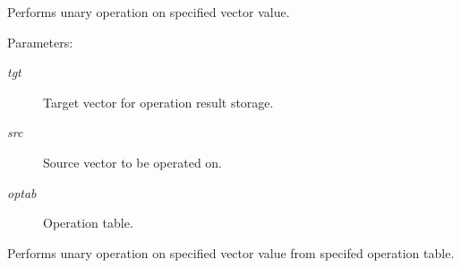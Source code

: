 Performs unary operation on specified vector value.

\begin{Desc}
\item[Parameters: ]\par
\begin{description}
\item[{\em 
tgt}]Target vector for operation result storage. \item[{\em 
src}]Source vector to be operated on. \item[{\em 
optab}]Operation table.\end{description}
\end{Desc}
Performs unary operation on specified vector value from specifed operation table. 